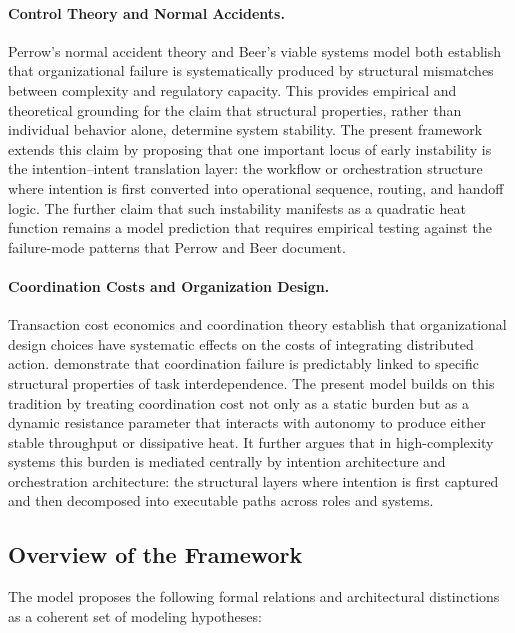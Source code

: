 \documentclass[12pt]{article}
\begin{document}
\paragraph{Control Theory and Normal Accidents.}
Perrow's normal accident theory \citep{perrow1984normal} and Beer's viable
systems model \citep{beer1972brain} both establish that organizational failure
is systematically produced by structural mismatches between complexity and
regulatory capacity. This provides empirical and theoretical grounding for the
claim that structural properties, rather than individual behavior alone,
determine system stability. The present framework extends this claim by
proposing that one important locus of early instability is the intention--intent
translation layer: the workflow or orchestration structure where intention is
first converted into operational sequence, routing, and handoff logic. The
further claim that such instability manifests as a quadratic heat function
remains a model prediction that requires empirical testing against the
failure-mode patterns that Perrow and Beer document.

\paragraph{Coordination Costs and Organization Design.}
Transaction cost economics \citep{williamson1981economics} and coordination
theory \citep{malone1994interdisciplinary} establish that organizational design
choices have systematic effects on the costs of integrating distributed action.
\citet{puranam2012coordination} demonstrate that coordination failure is
predictably linked to specific structural properties of task interdependence.
The present model builds on this tradition by treating coordination cost not
only as a static burden but as a dynamic resistance parameter that interacts
with autonomy to produce either stable throughput or dissipative heat. It
further argues that in high-complexity systems this burden is mediated
centrally by intention architecture and orchestration architecture: the
structural layers where intention is first captured and then decomposed into
executable paths across roles and systems.

\subsection{Overview of the Framework}

The model proposes the following formal relations and architectural
distinctions as a coherent set of modeling hypotheses:
\end{document}
